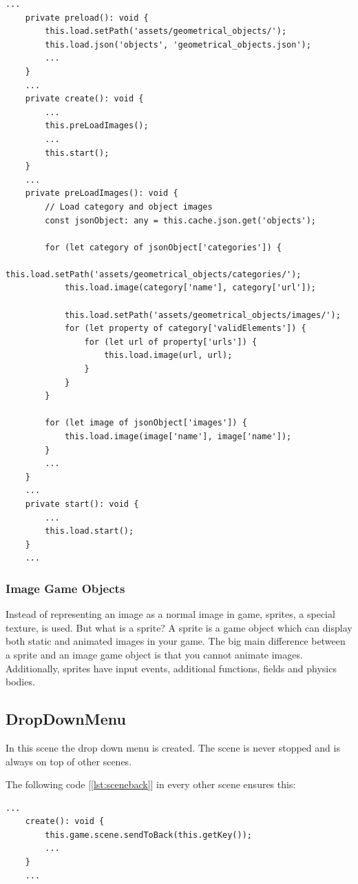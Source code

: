 \begin{lstlisting}[style=TypeScript, caption={preloadAsset.ts}, label={lst:jsonpreload}]
    ...
    private preload(): void {
        this.load.setPath('assets/geometrical_objects/');
        this.load.json('objects', 'geometrical_objects.json');
        ...
    }
    ...
    private create(): void {
        ...
        this.preLoadImages();
        ...
        this.start();
    }
    ...
    private preLoadImages(): void {
        // Load category and object images
        const jsonObject: any = this.cache.json.get('objects');

        for (let category of jsonObject['categories']) {
            this.load.setPath('assets/geometrical_objects/categories/');
            this.load.image(category['name'], category['url']);

            this.load.setPath('assets/geometrical_objects/images/');
            for (let property of category['validElements']) {
                for (let url of property['urls']) {
                    this.load.image(url, url);
                }
            }
        }

        for (let image of jsonObject['images']) {
            this.load.image(image['name'], image['name']);
        }
        ...
    }
    ...
    private start(): void {
        ...
        this.load.start();
    }
    ...
\end{lstlisting}

\subsubsection{Image Game Objects}
Instead of representing an image as a normal image in game, sprites, a special texture, is used.
But what is a sprite?
A sprite is a game object which can display both static and animated images in your game.
The big main difference between a sprite and an image game object is that you cannot animate images.
Additionally, sprites have input events, additional functions, fields and physics bodies.

\subsection{DropDownMenu}\label{subsec:dropdownmenu}
In this scene the drop down menu is created.
The scene is never stopped and is always on top of other scenes.

The following code [\ref{lst:sceneback}] in every other scene ensures this:
\begin{lstlisting}[style=TypeScript, caption={Send current scene to back}, label={lst:sceneback}]
    ...
    create(): void {
        this.game.scene.sendToBack(this.getKey());
        ...
    }
    ...
\end{lstlisting}

